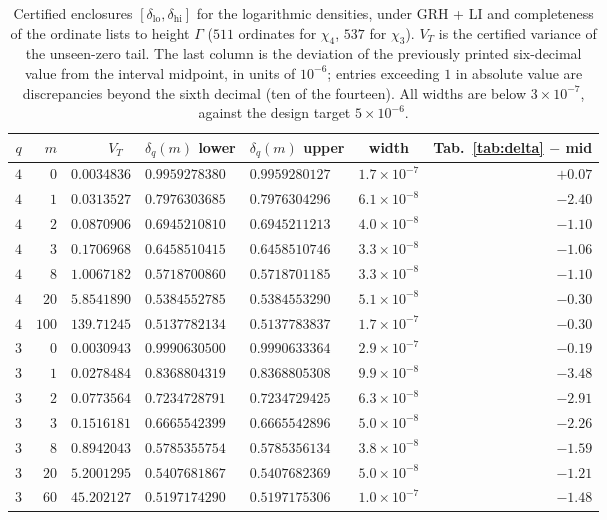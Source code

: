 \begin{table}[h]\centering
\begin{tabular}{crrllcr}
\toprule
$q$ & $m$ & $V_T$\quad\ & $\delta_q(m)$ lower & $\delta_q(m)$ upper &
width & Tab.~\ref{tab:delta} $-$ mid \\
\midrule
$4$ & $0$   & $0.0034836$ & $0.9959278380$ & $0.9959280127$ & $1.7\times10^{-7}$ & $+0.07$ \\
$4$ & $1$   & $0.0313527$ & $0.7976303685$ & $0.7976304296$ & $6.1\times10^{-8}$ & $-2.40$ \\
$4$ & $2$   & $0.0870906$ & $0.6945210810$ & $0.6945211213$ & $4.0\times10^{-8}$ & $-1.10$ \\
$4$ & $3$   & $0.1706968$ & $0.6458510415$ & $0.6458510746$ & $3.3\times10^{-8}$ & $-1.06$ \\
$4$ & $8$   & $1.0067182$ & $0.5718700860$ & $0.5718701185$ & $3.3\times10^{-8}$ & $-1.10$ \\
$4$ & $20$  & $5.8541890$ & $0.5384552785$ & $0.5384553290$ & $5.1\times10^{-8}$ & $-0.30$ \\
$4$ & $100$ & $139.71245$ & $0.5137782134$ & $0.5137783837$ & $1.7\times10^{-7}$ & $-0.30$ \\
\midrule
$3$ & $0$   & $0.0030943$ & $0.9990630500$ & $0.9990633364$ & $2.9\times10^{-7}$ & $-0.19$ \\
$3$ & $1$   & $0.0278484$ & $0.8368804319$ & $0.8368805308$ & $9.9\times10^{-8}$ & $-3.48$ \\
$3$ & $2$   & $0.0773564$ & $0.7234728791$ & $0.7234729425$ & $6.3\times10^{-8}$ & $-2.91$ \\
$3$ & $3$   & $0.1516181$ & $0.6665542399$ & $0.6665542896$ & $5.0\times10^{-8}$ & $-2.26$ \\
$3$ & $8$   & $0.8942043$ & $0.5785355754$ & $0.5785356134$ & $3.8\times10^{-8}$ & $-1.59$ \\
$3$ & $20$  & $5.2001295$ & $0.5407681867$ & $0.5407682369$ & $5.0\times10^{-8}$ & $-1.21$ \\
$3$ & $60$  & $45.202127$ & $0.5197174290$ & $0.5197175306$ & $1.0\times10^{-7}$ & $-1.48$ \\
\bottomrule
\end{tabular}
\caption{Certified enclosures $[\delta_{\mathrm{lo}},
\delta_{\mathrm{hi}}]$ for the logarithmic densities, under
GRH + LI and completeness of the ordinate lists to height $\Gamma$
($511$ ordinates for $\chi_4$, $537$ for $\chi_3$). $V_T$ is the
certified variance of the unseen-zero tail. The last column is the
deviation of the previously printed six-decimal value from the interval
midpoint, in units of $10^{-6}$; entries exceeding $1$ in absolute
value are discrepancies beyond the sixth decimal (ten of the fourteen).
All widths are below $3\times10^{-7}$, against the design target
$5\times10^{-6}$.}
\label{tab:enclose}
\end{table}

